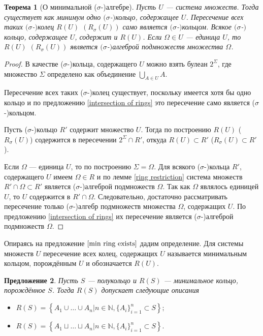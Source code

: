 \documentclass[12pt]{article}
\newtheorem{theorem}{Теорема}
\newtheorem{proposition}[theorem]{Предложение}
\numberwithin{theorem}{section}
\theoremstyle{definition}
\newcommand{\defin}[2]{\hypertarget{#2}{{\color{red} #1}}}
\newcommand{\defineset}[2]{\left\{
	\left.
	#1
	\right\vert
	#2
	\right\}}
\begin{document}
	\begin{theorem}[О минимальной ($ \sigma $-)алгебре] \label{min ring exists}
		Пусть $ U $ --- система множеств. Тогда существует как минимум одно $ ( $$ \sigma $-$ ) $кольцо, содержащее $ U $.
		Пересечение всех таких $ ( $$ \sigma $-$ ) $колец $ R(U) $ $ (R_{\sigma}(U)) $ само является $ ( $$ \sigma $-$ ) $кольцом. 
		Всякое $ ( $$ \sigma $-$ ) $кольцо, содержащее $ U $, содержит и $ R(U) $. 
		Если $ \Omega \in U $ --- единица $ U $, 
		то $ R(U) $ $ (R_{\sigma}(U)) $ является $ ( $$ \sigma $-$ ) $алгеброй подмножеств множества $ \Omega $.
	\end{theorem}
	
	\begin{proof}
		В качестве ($ \sigma $-)кольца, содержащего $ U $ можно взять булеан $ 2^{\Sigma} $, 
		где множество $ \Sigma $ определено как объединение $ \bigcup\limits_{A \in U} A $.
		
		Пересечение всех таких ($ \sigma $-)колец существует, поскольку имеется хотя бы одно кольцо и
		по предложению \ref{intersection of rings} это пересечение само является ($ \sigma $-)кольцом.
		
		Пусть ($ \sigma $-)кольцо $ R' $ содержит множество $ U $. 
		Тогда по построению $ R(U) $ ($ R_{\sigma}(U) $) содержится в пересечении $ 2^{\Sigma} \cap R' $,
		откуда $ R(U) \subset R' $ ($ R_{\sigma}(U) \subset R' $).
		
		Если $ \Omega $ --- единица $ U $, то по построению $ \Sigma = \Omega $.
		Для всякого ($ \sigma $-)кольца $ R' $, содержащего $ U $ имеем $ \Omega \in R $ и по лемме \ref{ring restriction}
		система множеств $ R' \cap \Omega \subset R' $ является ($ \sigma $-)алгеброй подмножеств $ \Omega $.
		Так как $ \Omega $ являлось единицей $ U $, то $ U $ содержится в $ R' \cap \Omega $.
		Следовательно, достаточно рассматривать пересечение только ($ \sigma $-)алгебр подмножеств множества $ \Omega $,
		содержащих $ U $. По предложению \ref{intersection of rings} их пересечение является ($ \sigma $-)алгеброй подмножеств $ \Omega $.
	\end{proof}
	
	Опираясь на предложение $ \ref{min ring exists} $ дадим определение. 
	Для системы множеств $ U $ пересечение всех колец, содержащих $ U $ называется \defin{минимальным кольцом,
	порождённым $ U $}{min-ring} и обозначается $ R(U) $.
	
	\begin{proposition} \label{min ring description}
		Пусть $ S $ --- полукольцо и $ R(S) $ --- минимальное кольцо, порождённое $ S $.
		Тогда $ R(S) $ допускает следующие описания
		\begin{itemize}
			\item $ R(S) = \defineset{A_1 \cup \ldots \cup A_n}{n \in \mathbb{N}, \{A_i\}_{i = 1}^{n} \subset S}; $
			\item $ R(S) = \defineset{A_1 \sqcup \ldots \sqcup A_n}{n \in \mathbb{N}, \{A_i\}_{i = 1}^{n} \subset S}. $
		\end{itemize}
	\end{proposition}
	
\end{document}
